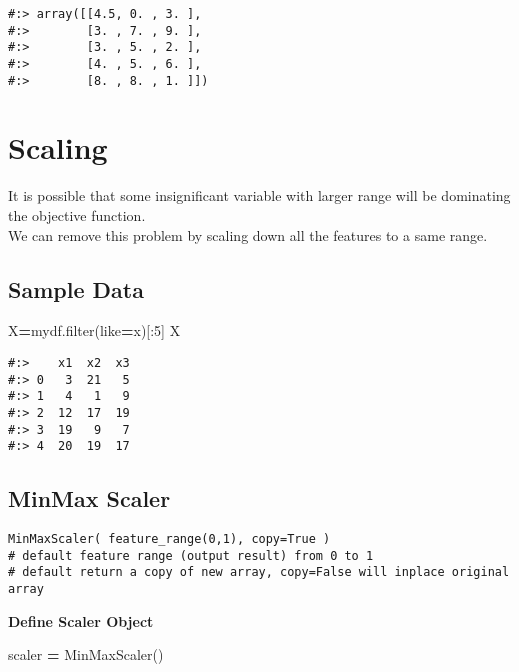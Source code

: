 \documentclass[
]{book}
\newenvironment{Shaded}{\begin{snugshade}}{\end{snugshade}}
\newcommand{\BuiltInTok}[1]{#1}
\newcommand{\DecValTok}[1]{\textcolor[rgb]{0.06,0.06,0.06}{#1}}
\newcommand{\NormalTok}[1]{#1}
\newcommand{\OperatorTok}[1]{\textcolor[rgb]{0.43,0.43,0.43}{\textbf{#1}}}
\newcommand{\StringTok}[1]{\textcolor[rgb]{0.5,0.5,0.5}{#1}}
\begin{document}
\begin{verbatim}
#:> array([[4.5, 0. , 3. ],
#:>        [3. , 7. , 9. ],
#:>        [3. , 5. , 2. ],
#:>        [4. , 5. , 6. ],
#:>        [8. , 8. , 1. ]])
\end{verbatim}

\hypertarget{scaling}{%
\section{Scaling}\label{scaling}}

It is possible that some insignificant variable with larger range will be dominating the objective function.\\
We can remove this problem by scaling down all the features to a same range.

\hypertarget{sample-data-24}{%
\subsection{Sample Data}\label{sample-data-24}}

\begin{Shaded}
\begin{Highlighting}[]
\NormalTok{X}\OperatorTok{=}\NormalTok{mydf.}\BuiltInTok{filter}\NormalTok{(like}\OperatorTok{=}\StringTok{\textquotesingle{}x\textquotesingle{}}\NormalTok{)[:}\DecValTok{5}\NormalTok{]}
\NormalTok{X}
\end{Highlighting}
\end{Shaded}

\begin{verbatim}
#:>    x1  x2  x3
#:> 0   3  21   5
#:> 1   4   1   9
#:> 2  12  17  19
#:> 3  19   9   7
#:> 4  20  19  17
\end{verbatim}

\hypertarget{minmax-scaler}{%
\subsection{MinMax Scaler}\label{minmax-scaler}}

\begin{verbatim}
MinMaxScaler( feature_range(0,1), copy=True )
# default feature range (output result) from 0 to 1
# default return a copy of new array, copy=False will inplace original array
\end{verbatim}

\textbf{Define Scaler Object}

\begin{Shaded}
\begin{Highlighting}[]
\NormalTok{scaler }\OperatorTok{=}\NormalTok{ MinMaxScaler()}
\end{Highlighting}
\end{Shaded}
\end{document}
